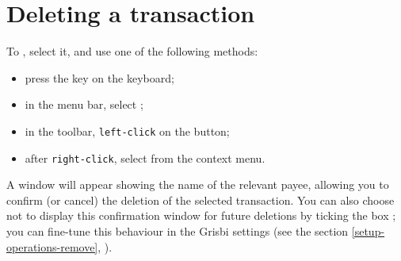 \section{Deleting a transaction\label{transactions-delete}}

To , select it, and use one of the following methods:
\begin{itemize}
	\item press the  key on the keyboard;
	\item in the menu bar, select ;
	\item in the toolbar, \texttt{left-click} on the  button;
	\item after \texttt{right-click}, select  from the context menu.
\end{itemize}

A window will appear showing the name of the relevant payee, allowing you to confirm (or cancel) the deletion of the selected transaction. You can also choose not to display this confirmation window for future deletions by ticking the box ; you can fine-tune this behaviour in the Grisbi settings (see the section \vref{setup-operations-remove}, ).

